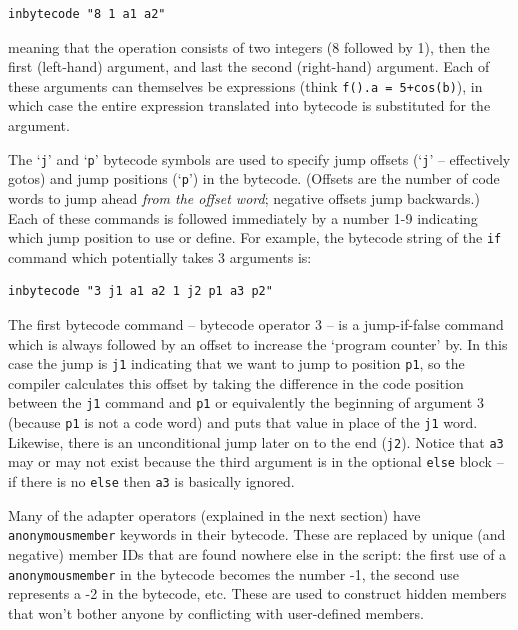 \documentclass{article}
\newenvironment{code}{
       \begin{list}{}{
               \setlength{\leftmargin}{.4in}
               \setlength{\rightmargin}{0in}
               \setlength{\topsep}{.2in}
       }
       \small
       \item[] }
       { \end{list}   }
\begin{document}
\begin{code} \begin{verbatim}
inbytecode "8 1 a1 a2"
\end{verbatim} \end{code}

\noindent meaning that the operation consists of two integers (8 followed by 1), then the first (left-hand) argument, and last the second (right-hand) argument.  Each of these arguments can themselves be expressions (think \verb#f().a = 5+cos(b)#), in which case the entire expression translated into bytecode is substituted for the argument.

The `\verb#j#' and `\verb#p#' bytecode symbols are used to specify jump offsets (`\verb#j#' -- effectively gotos) and jump positions (`\verb#p#') in the bytecode.  (Offsets are the number of code words to jump ahead \emph{from the offset word}; negative offsets jump backwards.)  Each of these commands is followed immediately by a number 1-9 indicating which jump position to use or define.  For example, the bytecode string of the \verb#if# command which potentially takes 3 arguments is:

\begin{code} \begin{verbatim}
inbytecode "3 j1 a1 a2 1 j2 p1 a3 p2"
\end{verbatim} \end{code}

\noindent The first bytecode command -- bytecode operator 3 -- is a jump-if-false command which is always followed by an offset to increase the `program counter' by.  In this case the jump is \verb#j1# indicating that we want to jump to position \verb#p1#, so the compiler calculates this offset by taking the difference in the code position between the \verb#j1# command and \verb#p1# or equivalently the beginning of argument 3 (because \verb#p1# is not a code word) and puts that value in place of the \verb#j1# word.  Likewise, there is an unconditional jump later on to the end (\verb#j2#).  Notice that \verb#a3# may or may not exist because the third argument is in the optional \verb#else# block -- if there is no \verb#else# then \verb#a3# is basically ignored.

Many of the adapter operators (explained in the next section) have \verb#anonymousmember# keywords in their bytecode.  These are replaced by unique (and negative) member IDs that are found nowhere else in the script:  the first use of a \verb#anonymousmember# in the bytecode becomes the number -1, the second use represents a -2 in the bytecode, etc.  These are used to construct hidden members that won't bother anyone by conflicting with user-defined members.
\end{document}
